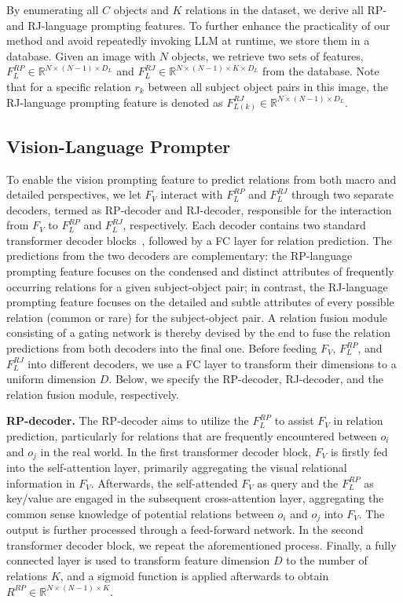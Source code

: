 By enumerating all $C$ objects and $K$ relations in the dataset, we derive all RP- and RJ-language prompting features.
To further enhance the practicality of our method and avoid repeatedly invoking LLM at runtime, we store them in a database.
Given an image with $N$ objects, we retrieve two sets of features, $F_{L}^{RP} \in \mathbb{R}^{N \times (N-1) \times D_{L}}$ and $F_{L}^{RJ} \in \mathbb{R}^{N \times (N-1) \times K \times D_{L}}$ from the database.
Note that for a specific relation $r_{k}$ between all subject object pairs in this image, the RJ-language prompting feature is denoted as $F_{L(k)}^{RJ} \in \mathbb{R}^{N \times (N-1) \times D_{L}}$.


\subsection{Vision-Language Prompter}
\label{vlprompt:sec:vision_language_prompter}

To enable the vision prompting feature to predict relations from both macro and detailed perspectives, we let $F_V$ interact with $F_L^{RP}$ and $F_L^{RJ}$ through two separate decoders, termed as RP-decoder and RJ-decoder, responsible for the interaction from $F_V$ to $F_L^{RP}$ and $F_L^{RJ}$, respectively. 
Each decoder contains two standard transformer decoder blocks~\citep{vaswani2017attention}, followed by a FC layer for relation prediction.
The predictions from the two decoders are complementary: the RP-language prompting feature focuses on the condensed and distinct attributes of frequently occurring relations for a given subject-object pair; in contrast, the RJ-language prompting feature focuses on the detailed and subtle attributes of every possible relation (common or rare) for the subject-object pair. A relation fusion module consisting of a gating network is thereby devised by the end to fuse the relation predictions from both decoders into the final one. Before feeding $F_V$, $F_L^{RP}$, and $F_L^{RJ}$ into different decoders, we use a FC layer to transform their dimensions to a uniform dimension $D$. Below, we specify the RP-decoder, RJ-decoder, and the relation fusion module, respectively.

\noindent \textbf{RP-decoder.}
The RP-decoder aims to utilize the $F_{L}^{RP}$ to assist $F_{V}$ in relation prediction, particularly for relations that are frequently encountered between $o_i$ and $o_j$ in the real world.
In the first transformer decoder block, $F_{V}$ is firstly fed into the self-attention layer, primarily aggregating the visual relational information in $F_{V}$.
Afterwards, the self-attended $F_{V}$ as query and the $F_{L}^{RP}$ as key/value are engaged in the subsequent cross-attention layer,
 aggregating the common sense knowledge of potential relations between $o_i$ and $o_j$ into $F_{V}$. 
The output is further processed through a feed-forward network.
In the second transformer decoder block, we repeat the aforementioned process.
Finally, a fully connected layer is used to transform feature dimension $D$ to the number of relations $K$, and a sigmoid function is applied afterwards to obtain $R^{RP} \in \mathbb{R}^{N \times (N-1) \times K}$. 

